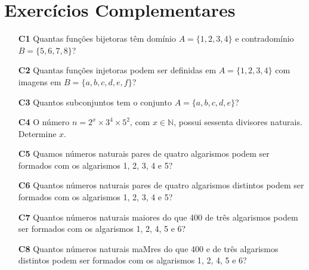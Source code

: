 \documentclass[a4paper,12pt]{article}
\begin{document}
\section{Exercícios Complementares}

\begin{enumerate}

\item[\textbf{C1}] Quantas funções bijetoras têm domínio $A = \{1, 2, 3, 4 \}$ e contradomínio $B = \{5, 6, 7, 8 \}$? 

\item[\textbf{C2}] Quantas funções injetoras podem ser definidas em $A = \{1, 2, 3, 4\}$ com imagens em $B = \{a, b, c, d, e, f\}$? 

\item[\textbf{C3}] Quantos subconjuntos tem o conjunto $A = \{a, b, c, d, e\}$? 

\item[\textbf{C4}] O número $n = 2^x \times 3^4 \times 5^2 \textrm{, com } x \in \mathbb{N}$, possui sessenta divisores naturais. Determine $x$. 

\item[\textbf{C5}] Quamos números naturais pares de quatro algarismos podem ser formados com os algarismos 1, 2, 3, 4 e 5? 

\item[\textbf{C6}] Quantos números naturais pares de quatro algarismos distintos podem ser formados com os algarismos 1, 2, 3, 4 e 5?

\item[\textbf{C7}] Quantos números naturais maiores do que 400 de três algarismos podem ser formados com os algarismos 1, 2, 4, 5 e 6?

\item[\textbf{C8}] Quantos números naturais maMres do que 400 e de três algarismos distintos podem ser formados com os algarismos 1, 2, 4, 5 e 6? 

\end{enumerate}
\end{document}
